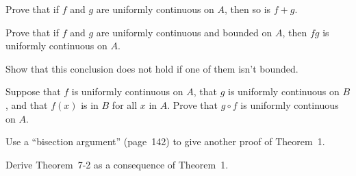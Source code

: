 \begin{letters}
\item Prove that if $f$ and $g$ are uniformly continuous on $A$, then so is
  $f + g$.
\item Prove that if $f$ and $g$ are uniformly continuous and bounded on $A$,
  then $fg$ is uniformly continuous on $A$.
\item Show that this conclusion does not hold if one of them isn't bounded.
\item Suppose that $f$ is uniformly continuous on $A$, that $g$ is uniformly
  continuous on $B$, and that $f(x)$ is in $B$ for all $x$ in $A$. Prove that
  $g \circ f$ is uniformly continuous on $A$.
\end{letters}

 Use a ``bisection argument'' (page~142) to give another proof of
Theorem~1.

 Derive Theorem~7-2 as a consequence of Theorem~1.
